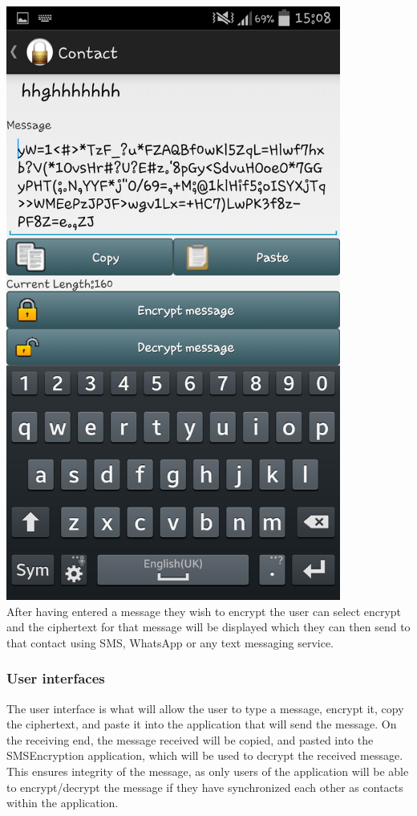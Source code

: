 \begin{center}
 \includegraphics[width=11cm]{screenshots/normal/5_ContactPostEncrypt.png}
\textbf{\\}
 After having entered a message they wish to encrypt the user can select encrypt and the ciphertext for that message will be displayed which they can then send to that contact using SMS, WhatsApp or any text messaging service.
\end{center}
\newpage
\subsubsection{User interfaces}
 The user interface is what will allow the user to type a message, encrypt it, copy the ciphertext, and paste it into the application that will send the message. On the receiving end, the message received will be copied, and pasted into the SMSEncryption application, which will be used to decrypt the received message. This ensures integrity of the message, as only users of the application will be able to encrypt/decrypt the message if they have synchronized each other as contacts within the application.
